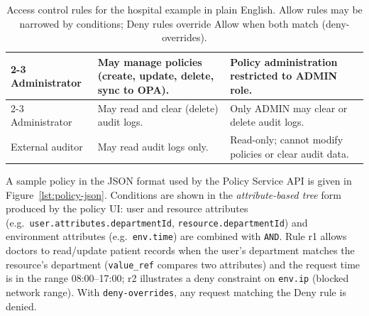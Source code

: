 \begin{table}[H]
\begin{tabular}{|l|p{5.2cm}|p{5.8cm}|}
\cline{2-3}
Administrator & May manage policies (create, update, delete, sync to OPA). & Policy administration restricted to ADMIN role. \\
\cline{2-3}
Administrator & May read and clear (delete) audit logs. & Only ADMIN may clear or delete audit logs. \\
\hline
External auditor & May read audit logs only. & Read-only; cannot modify policies or clear audit data. \\
\hline
\end{tabular}
\caption{Access control rules for the hospital example in plain English. Allow rules may be narrowed by conditions; Deny rules override Allow when both match (deny-overrides).}
\label{tab:access-control-rules-plain}
\end{table}

\vspace{0.5cm}

A sample policy in the JSON format used by the Policy Service API is given in Figure~\ref{lst:policy-json}. Conditions are shown in the \emph{attribute-based tree} form produced by the policy UI: user and resource attributes (e.g.\ \texttt{user.attributes.departmentId}, \texttt{resource.departmentId}) and environment attributes (e.g.\ \texttt{env.time}) are combined with \texttt{AND}. Rule r1 allows doctors to read/update patient records when the user's department matches the resource's department (\texttt{value\_ref} compares two attributes) and the request time is in the range 08:00--17:00; r2 illustrates a deny constraint on \texttt{env.ip} (blocked network range). With \texttt{deny-overrides}, any request matching the Deny rule is denied.

